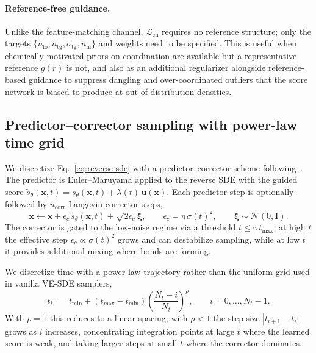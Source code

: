\paragraph{Reference-free guidance.}
Unlike the feature-matching channel, $\mathcal{L}_{\mathrm{cn}}$ requires no
reference structure; only the targets
$\{n_{\mathrm{lo}}, n_{\mathrm{tg}}, \sigma_{\mathrm{tg}}, n_{\mathrm{hi}}\}$
and weights need to be specified. This is useful when chemically motivated
priors on coordination are available but a representative reference $g(r)$
is not, and also as an additional regularizer alongside reference-based
guidance to suppress dangling and over-coordinated outliers that the score
network is biased to produce at out-of-distribution densities.

\subsection{Predictor--corrector sampling with power-law time grid}
\label{sec:sampler}

We discretize Eq.~\eqref{eq:reverse-sde} with a predictor--corrector scheme
following~\cite{song2021score}. The predictor is Euler--Maruyama applied to
the reverse SDE with the guided score
$\tilde{s}_\theta(\mathbf{x},t) = s_\theta(\mathbf{x},t) + \lambda(t)\,\mathbf{u}(\mathbf{x})$.
Each predictor step is optionally followed by $n_{\mathrm{corr}}$ Langevin
corrector steps,
\begin{equation}
    \mathbf{x}
    \leftarrow \mathbf{x}
    + \epsilon_c\,\tilde{s}_\theta(\mathbf{x},t)
    + \sqrt{2\epsilon_c}\,\bm{\xi},
    \qquad
    \epsilon_c = \eta\,\sigma(t)^{2},\qquad \bm{\xi}\sim\mathcal{N}(0,\mathbf{I}).
    \label{eq:corrector}
\end{equation}
The corrector is gated to the low-noise regime via a threshold
$t\le\gamma\, t_{\max}$; at high $t$ the effective step
$\epsilon_c\propto\sigma(t)^{2}$ grows and can destabilize sampling, while at
low $t$ it provides additional mixing where bonds are forming.

We discretize time with a power-law trajectory rather than the uniform grid
used in vanilla VE-SDE samplers,
\begin{equation}
    t_i \;=\; t_{\min} + (t_{\max}-t_{\min})\left(\frac{N_t-i}{N_t}\right)^{\rho},
    \qquad i = 0,\dots,N_t-1.
    \label{eq:power-law-ts}
\end{equation}
With $\rho=1$ this reduces to a linear spacing; with $\rho<1$ the step size
$|t_{i+1}-t_i|$ grows as $i$ increases, concentrating integration points at
large $t$ where the learned score is weak, and taking larger steps at small
$t$ where the corrector dominates.

